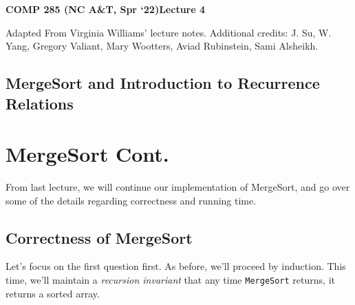 \documentclass [12pt]{article}
\begin{document}
 

{\LARGE \textbf {COMP 285 (NC A\&T, Spr `22)}\hfill \textbf {Lecture 4} } 
\vspace {1em} 
\begin {Instruction} 

Adapted From Virginia Williams' lecture notes. Additional credits: J. Su, W. Yang, Gregory Valiant, Mary Wootters, Aviad Rubinstein, Sami Alsheikh.
\end {Instruction} 

\begin{centering}
\section*{MergeSort and Introduction to Recurrence Relations}
\end{centering}

\section{MergeSort Cont.}

From last lecture, we will continue our implementation of MergeSort, and go over some of the details regarding correctness and running time.

\subsection{Correctness of MergeSort}
Let's focus on the first question first. As before, we'll proceed by induction. This time, we'll maintain a \textit{recursion invariant} that any time \texttt{MergeSort} returns, it returns a sorted array.
\end{document}
